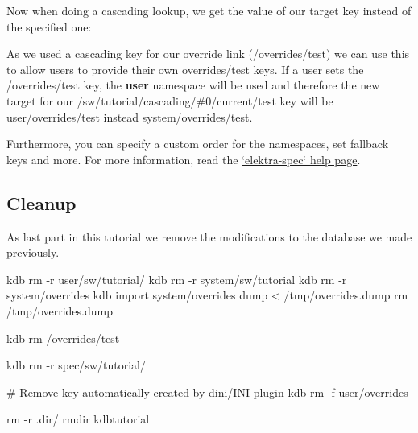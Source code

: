 Now when doing a cascading lookup, we get the value of our target key instead of the specified one\+:




As we used a cascading key for our override link ({\ttfamily /overrides/test}) we can use this to allow users to provide their own {\ttfamily overrides/test} keys. If a user sets the {\ttfamily /overrides/test} key, the {\bfseries user} namespace will be used and therefore the new target for our {\ttfamily /sw/tutorial/cascading/\#0/current/test} key will be {\ttfamily user/overrides/test} instead {\ttfamily system/overrides/test}.




Furthermore, you can specify a custom order for the namespaces, set fallback keys and more. For more information, read the \hyperlink{md_doc_help_elektra-spec_doc_help_elektra-spec_md}{`elektra-\/spec` help page}.

\subsection*{Cleanup}

As last part in this tutorial we remove the modifications to the database we made previously.


\begin{DoxyCode}
kdb rm -r user/sw/tutorial/
kdb rm -r system/sw/tutorial
kdb rm -r system/overrides
kdb import system/overrides dump < /tmp/overrides.dump
rm /tmp/overrides.dump

kdb rm /overrides/test

kdb rm -r spec/sw/tutorial/

# Remove key automatically created by dini/INI plugin
kdb rm -f user/overrides

rm -r .dir/
rmdir kdbtutorial
\end{DoxyCode}
 